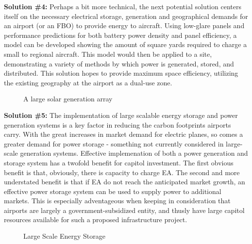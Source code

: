 \documentclass[../main.tex]{subfiles}
\begin{document}
\newpage
\noindent\textbf{Solution \#4:}\newline
\indent Perhaps a bit more technical, the next potential solution centers itself on the necessary electrical storage, generation and geographical demands for an airport (or an FBO) to provide energy to aircraft. Using low-glare panels and performance predictions for both battery power density and panel efficiency, a model can be developed showing the amount of square yards required to charge a small to regional aircraft. This model would then be applied to a site, demonstrating a variety of methods by which power is generated, stored, and distributed. This solution hopes to provide maximum space efficiency, utilizing the existing geography at the airport as a dual-use zone.\par
\begin{figure}[h!]
    \centering
    \caption{A large solar generation array}
    \centering
\end{figure}

\newpage
\noindent\textbf{Solution \#5:}\newline
\indent The implementation of large scalable energy storage and power generation systems is a key factor in reducing the carbon footprints airports carry. With the great increases in market demand for electric planes, so comes a greater demand for power storage - something not currently considered in large-scale generation systems. Effective implemenation of both a power generation and storage system has a twofold benefit for capitol investment. The first obvious benefit is that, obviously, there is capacity to charge EA. The second and more understated benefit is that if EA do not reach the anticipated market growth, an effective power storage system can be used to supply power to additional markets. This is especially adventageous when keeping in consideration that airports are largely a government-subsidized entity, and thusly have large capitol resources available for such a proposed infrastructure project.
\begin{figure}[h!]
    \centering
    \caption{Large Scale Energy Storage}
    \centering
\end{figure}
\end{document}
